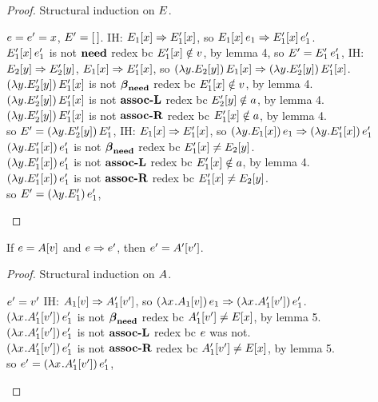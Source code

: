 \documentclass{article}
\begin{document}
\begin{proof}
Structural induction on $\E$.
\begin{byCases}
  \case{\E = \hole} $\e = \e' = x$, $\E' = \hole$.
  IH: $\Ex[_1] \pstep \Ex[_1']$, 
  so $\ap{\Ex[_1]}{\e_1} \pstep \ap{\Ex[_1']}{\e_1'}$. \\
  $\ap{\Ex[_1']}{\e_1'}$ is not $\need$ redex bc $\Ex[_1'] \notin \val$,
  by lemma 4,
  so $\E' = \ap{\E_1'}{\e_1'}$, 
  IH: $\Ey[_2] \pstep \Ey[_2']$, $\Ex[_1] \pstep \Ex[_1']$, 
  so $\app{\lyEy[_2]}{\Ex[_1]} \pstep \app{\lyEy[_2']}{\Ex[_1']}$. \\
  $\app{\lyEy[_2']}{\Ex[_1']}$ is not $\betaneednr$ redex 
  bc $\Ex[_1'] \notin \val$, by lemma 4. \\
  $\app{\lyEy[_2']}{\Ex[_1']}$ is not $\assocLnr$ redex 
  bc $\Ey[_2'] \notin \ans$, by lemma 4. \\
  $\app{\lyEy[_2']}{\Ex[_1']}$ is not $\assocRnr$ redex 
  bc $\Ex[_1'] \notin \ans$, by lemma 4. \\
  so $\E' = \app{\lyEy[_2']}{\E_1'}$,
  IH: $\Ex[_1] \pstep \Ex[_1']$, 
  so $\app{\ly{\Ex[_1]}}{\e_1} \pstep \app{\ly{\Ex[_1']}}{\e_1'}$ \\
  $\app{\ly{\Ex[_1']}}{\e_1'}$ is not $\betaneednr$ redex
  bc $\Ex[_1'] \neq \Ey[_2]$. \\
  $\app{\ly{\Ex[_1']}}{\e_1'}$ is not $\assocLnr$ redex 
  bc $\Ex[_1'] \notin \ans$, by lemma 4. \\
  $\app{\ly{\Ex[_1']}}{\e_1'}$ is not $\assocRnr$ redex 
  bc $\Ex[_1'] \neq \Ey[_2]$. \\
  so $\E' = \app{\ly{\E_1'}}{\e_1'}$,
\end{byCases}
\end{proof}

\begin{lemma}
\label{lem:aclosed}
If $\e = \Av$ and $\e \pstep \e'$, then $\e' = \inA[']{\val'}$.
\end{lemma}

\begin{proof}
Structural induction on $\A$.
\begin{byCases}
  \case{\A = \hole} $\e' = \val'$
  IH: $\Av[_1] \pstep \inA[_1']{\val'}$, 
  so $\app{\lx{\Av[_1]}}{\e_1} \pstep \app{\lx{\inA[_1']{\val'}}}{\e_1'}$. \\
  $\app{\lx{\inA[_1']{\val'}}}{\e_1'}$ is not $\betaneednr$ redex
  bc $\inA[_1']{\val'} \neq \Ex$, by lemma 5. \\
  $\app{\lx{\inA[_1']{\val'}}}{\e_1'}$ is not $\assocLnr$ redex 
  bc  $\e$ was not. \\
  $\app{\lx{\inA[_1']{\val'}}}{\e_1'}$ is not $\assocRnr$ redex 
  bc $\inA[_1']{\val'} \neq \Ex$, by lemma 5. \\
  so $\e' = \app{\lx{\inA[_1']{\val'}}}{\e_1'}$,
\end{byCases}
\end{proof}
\end{document}
